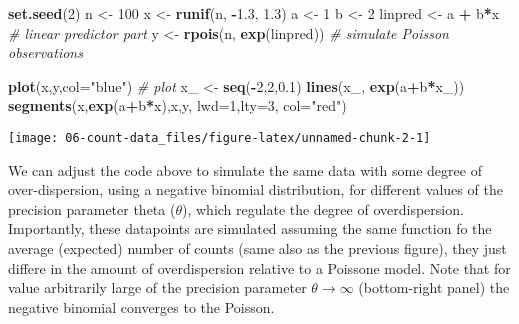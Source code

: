 \documentclass[
]{book}
\newenvironment{Shaded}{\begin{snugshade}}{\end{snugshade}}
\newcommand{\AttributeTok}[1]{\textcolor[rgb]{0.13,0.29,0.53}{#1}}
\newcommand{\CommentTok}[1]{\textcolor[rgb]{0.56,0.35,0.01}{\textit{#1}}}
\newcommand{\DecValTok}[1]{\textcolor[rgb]{0.00,0.00,0.81}{#1}}
\newcommand{\FloatTok}[1]{\textcolor[rgb]{0.00,0.00,0.81}{#1}}
\newcommand{\FunctionTok}[1]{\textcolor[rgb]{0.13,0.29,0.53}{\textbf{#1}}}
\newcommand{\NormalTok}[1]{#1}
\newcommand{\OtherTok}[1]{\textcolor[rgb]{0.56,0.35,0.01}{#1}}
\newcommand{\SpecialCharTok}[1]{\textcolor[rgb]{0.81,0.36,0.00}{\textbf{#1}}}
\newcommand{\StringTok}[1]{\textcolor[rgb]{0.31,0.60,0.02}{#1}}
\begin{document}
\begin{Shaded}
\begin{Highlighting}[]
\FunctionTok{set.seed}\NormalTok{(}\DecValTok{2}\NormalTok{)}
\NormalTok{n }\OtherTok{\textless{}{-}} \DecValTok{100}
\NormalTok{x }\OtherTok{\textless{}{-}} \FunctionTok{runif}\NormalTok{(n, }\SpecialCharTok{{-}}\FloatTok{1.3}\NormalTok{, }\FloatTok{1.3}\NormalTok{)}
\NormalTok{a }\OtherTok{\textless{}{-}} \DecValTok{1}
\NormalTok{b }\OtherTok{\textless{}{-}} \DecValTok{2}
\NormalTok{linpred }\OtherTok{\textless{}{-}}\NormalTok{ a }\SpecialCharTok{+}\NormalTok{ b}\SpecialCharTok{*}\NormalTok{x }\CommentTok{\# linear predictor part}
\NormalTok{y }\OtherTok{\textless{}{-}} \FunctionTok{rpois}\NormalTok{(n, }\FunctionTok{exp}\NormalTok{(linpred)) }\CommentTok{\# simulate Poisson observations}

\FunctionTok{plot}\NormalTok{(x,y,}\AttributeTok{col=}\StringTok{"blue"}\NormalTok{) }\CommentTok{\# plot}
\NormalTok{x\_ }\OtherTok{\textless{}{-}} \FunctionTok{seq}\NormalTok{(}\SpecialCharTok{{-}}\DecValTok{2}\NormalTok{,}\DecValTok{2}\NormalTok{,}\FloatTok{0.1}\NormalTok{)}
\FunctionTok{lines}\NormalTok{(x\_, }\FunctionTok{exp}\NormalTok{(a}\SpecialCharTok{+}\NormalTok{b}\SpecialCharTok{*}\NormalTok{x\_))}
\FunctionTok{segments}\NormalTok{(x,}\FunctionTok{exp}\NormalTok{(a}\SpecialCharTok{+}\NormalTok{b}\SpecialCharTok{*}\NormalTok{x),x,y, }\AttributeTok{lwd=}\DecValTok{1}\NormalTok{,}\AttributeTok{lty=}\DecValTok{3}\NormalTok{, }\AttributeTok{col=}\StringTok{"red"}\NormalTok{)}
\end{Highlighting}
\end{Shaded}

\begin{center}\texttt{[image: 06-count-data\_files/figure-latex/unnamed-chunk-2-1]} \end{center}

We can adjust the code above to simulate the same data with some degree of over-dispersion, using a negative binomial distribution, for different values of the precision parameter theta (\(\theta\)), which regulate the degree of overdispersion. Importantly, these datapoints are simulated assuming the same function fo the average (expected) number of counts (same also as the previous figure), they just differe in the amount of overdispersion relative to a Poissone model. Note that for value arbitrarily large of the precision parameter \(\theta \rightarrow \infty\) (bottom-right panel) the negative binomial converges to the Poisson.
\end{document}
